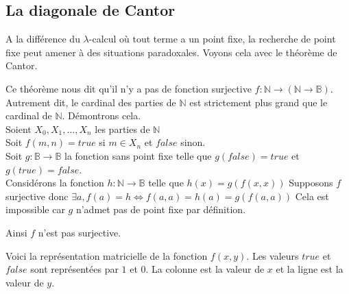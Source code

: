 \subsection{La diagonale de Cantor} %
 A la différence du $\lambda$-calcul où tout terme a un point fixe, la recherche de point fixe
peut amener à des situations paradoxales.
Voyons cela avec le théorème  de Cantor.


Ce théorème nous dit qu'il n'y a pas de fonction surjective 
$f: \mathbb{N} \rightarrow ( \mathbb{N} \rightarrow \mathbb{B}) $.
Autrement dit, le cardinal des parties de $\mathbb{N}$ est strictement plus grand que le cardinal de $\mathbb{N}$.
Démontrons cela. \\
Soient $X_0, X_1, \ldots, X_n$ les parties de $\mathbb{N}$  \\
Soit $f(m,n) = true$ si $m \in X_n$ et $false$ sinon. \\
Soit $g :\mathbb{B} \rightarrow \mathbb{B}$ la fonction sans point fixe telle que $g(false)=true$ et $g(true)=false$. \\
Considérons la fonction $h: \mathbb{N} \rightarrow \mathbb{B}$ telle que $h(x) = g(f(x,x))$
Supposons $f$ surjective donc $\exists a, f(a)= h \Leftrightarrow  f(a,a) = h(a) = g(f(a,a))$ 
Cela est impossible car $g$ n'admet pas de point fixe par définition.

Ainsi $f$ n'est pas surjective. \qedsymbol
\vspace{0.5cm}

Voici la représentation matricielle de la fonction $f(x,y)$. Les valeurs $true$ et $false$ sont représentées par $1$ et $0$.
La colonne est la valeur de $x$ et la ligne est la valeur de $y$.


